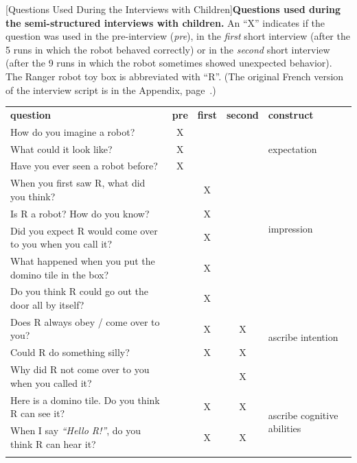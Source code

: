 \documentclass{sig-alternate}
\begin{document}
\begin{table}[h]
[Questions Used During the Interviews with Children]{\small \textbf{Questions used during the semi-structured interviews with children.} An ``X'' indicates if the question was used in the pre-interview (\textit{pre}), in the \textit{first} short interview (after the 5 runs in which the robot behaved correctly) or in the \textit{second} short interview (after the 9 runs in which the robot sometimes showed unexpected behavior). The Ranger robot toy box is abbreviated with ``R''. (The original French version of the interview script is in the Appendix, page~\pageref{apx:domino-interview}.)}
\label{tab:domino-questions}       %
\centering
\footnotesize
\begin{tabular}{lcccl}
\hline\noalign{\smallskip}
	\textbf{question} & \textbf{pre} & \textbf{first} & \textbf{second} & \textbf{construct} \\
\noalign{\smallskip}\hline\hline\noalign{\smallskip}

	How do you imagine a robot? & X & & & \multirow{3}{*}{expectation} \\
	What could it look like? & X & & & \\
	Have you ever seen a robot before? & X & & & \\
\noalign{\smallskip} \hline \noalign{\smallskip}

	When you first saw R, what did you think? &  & X & & \multirow{4}{*}{impression} \\
	Is R a robot? How do you know? & & X & & \\
	Did you expect R would come over to you when you call it? & & X & & \\
	What happened when you put the domino tile in the box? & & X & & \\
\noalign{\smallskip} \hline \noalign{\smallskip}

	Do you think R could go out the door all by itself? & & X & & \multirow{4}{*}{ascribe intention} \\	
	Does R always obey / come over to you? & & X & X & \\
	Could R do something silly? & & X & X & \\
	Why did R not come over to you when you called it? & & & X & \\
\noalign{\smallskip} \hline \noalign{\smallskip}

	Here is a domino tile. Do you think R can see it? & & X & X & \multirow{2}{*}{ascribe cognitive abilities} \\
	When I say \textit{``Hello R!''}, do you think R can hear it? & & X & X & \\	
\noalign{\smallskip} \hline \noalign{\smallskip}


\end{tabular}
\end{table}
\end{document}
